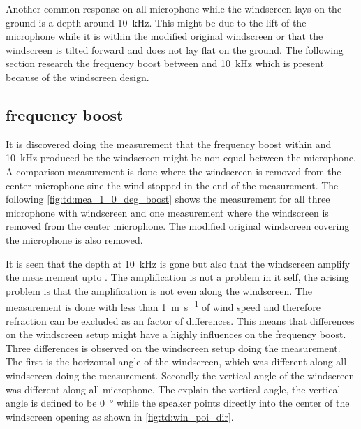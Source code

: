 Another common response on all microphone while the windscreen lays on the ground is a depth around \SI{10}{\kilo\hertz}. This might be due to the lift of the microphone while it is within the modified original windscreen or that the windscreen is tilted forward and does not lay flat on the ground. The following section research the frequency boost between  and \SI{10}{\kilo\hertz} which is present because of the windscreen design. 

\subsection{frequency boost}\label{sec:des:freq_boost}
It is discovered doing the measurement that the frequency boost within  and \SI{10}{\kilo\hertz} produced be the windscreen might be non equal between the microphone. A comparison measurement is done where the windscreen is removed from the center microphone sine the wind stopped in the end of the measurement. The following \autoref{fig:td:mea_1_0_deg_boost} shows the measurement for all three microphone with windscreen and one measurement where the windscreen is removed from the center microphone. The modified original windscreen covering the microphone is also removed.  


It is seen that the depth at \SI{10}{\kilo\hertz} is gone but also that the windscreen amplify the measurement upto . The amplification is not a problem in it self, the arising problem is that the amplification is not even along the windscreen. The measurement is done with less than \SI{1}{\meter\per\second} of wind speed and therefore refraction can be excluded as an factor of differences. This means that differences on the windscreen setup might have a highly influences on the frequency boost. Three differences is observed on the windscreen setup doing the measurement. The first is the horizontal angle of the windscreen, which was different along all windscreen doing the measurement. Secondly the vertical angle of the windscreen was different along all microphone. The explain the vertical angle, the vertical angle is defined to be \SI{0}{\degree} while the speaker points directly into the center of the windscreen opening as shown in \autoref{fig:td:win_poi_dir}.



